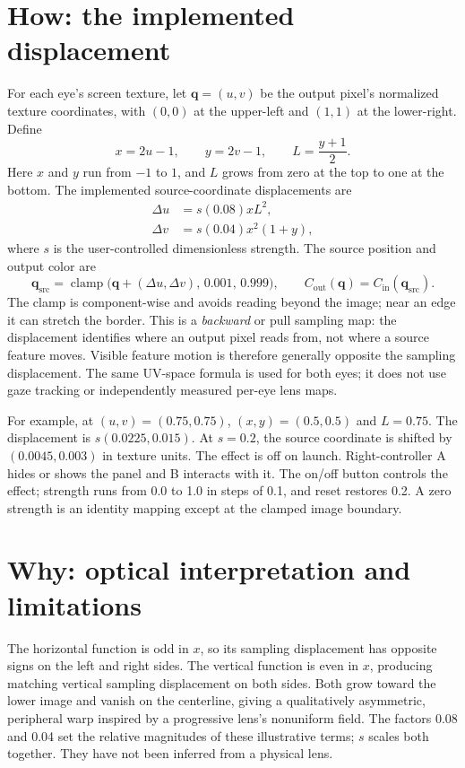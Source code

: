 \documentclass[11pt,a4paper]{article}
\begin{document}
\section{How: the implemented displacement}
For each eye's screen texture, let $\mathbf{q}=(u,v)$ be the output pixel's
normalized texture coordinates, with $(0,0)$ at the upper-left and $(1,1)$ at
the lower-right. Define
\begin{equation}
 x=2u-1,\qquad y=2v-1,\qquad L=\frac{y+1}{2}.
\end{equation}
Here $x$ and $y$ run from $-1$ to $1$, and $L$ grows from zero at the top
to one at the bottom. The implemented source-coordinate displacements are
\begin{align}
 \Delta u &= s(0.08)xL^2,\\
 \Delta v &= s(0.04)x^2(1+y),
\end{align}
where $s$ is the user-controlled dimensionless strength. The source position
and output color are
\begin{equation}
 \mathbf{q}_{\mathrm{src}}=
 \operatorname{clamp}\bigl(\mathbf{q}+(\Delta u,\Delta v),\,0.001,\,0.999\bigr),
 \qquad C_{\mathrm{out}}(\mathbf{q})=C_{\mathrm{in}}(\mathbf{q}_{\mathrm{src}}).
\end{equation}
The clamp is component-wise and avoids reading beyond the image; near an edge
it can stretch the border. This is a \emph{backward} or pull sampling map:
the displacement identifies where an output pixel reads from, not where a
source feature moves. Visible feature motion is therefore generally opposite
the sampling displacement. The same UV-space formula is used for both eyes; it
does not use gaze tracking or independently measured per-eye lens maps.

For example, at $(u,v)=(0.75,0.75)$, $(x,y)=(0.5,0.5)$ and $L=0.75$.
The displacement is $s(0.0225,0.015)$. At $s=0.2$, the source coordinate is
shifted by $(0.0045,0.003)$ in texture units.
The effect is off on launch. Right-controller A hides or shows the panel and B
interacts with it. The on/off button controls the effect; strength runs from
0.0 to 1.0 in steps of 0.1, and reset restores 0.2. A zero strength is an
identity mapping except at the clamped image boundary.

\section{Why: optical interpretation and limitations}
The horizontal function is odd in $x$, so its sampling displacement has
opposite signs on the left and right sides. The vertical function is even in
$x$, producing matching vertical sampling displacement on both sides. Both
grow toward the lower image and vanish on the centerline, giving a
qualitatively asymmetric, peripheral warp inspired by a progressive lens's
nonuniform field. The factors 0.08 and 0.04 set the relative magnitudes of
these illustrative terms; $s$ scales both together. They have not been
inferred from a physical lens.
\end{document}
